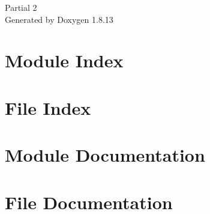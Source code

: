 \documentclass[twoside]{book}
\newcommand{\+}{\discretionary{\mbox{\scriptsize$\hookleftarrow$}}{}{}}
\newcommand{\clearemptydoublepage}{%
  \newpage{\pagestyle{empty}\cleardoublepage}%
}
\begin{document}
\hypersetup{pageanchor=false,
             bookmarksnumbered=true,
             pdfencoding=unicode
            }
\begin{titlepage}
\vspace*{7cm}
\begin{center}%
{\Large Partial 2 }\\
\vspace*{1cm}
{\large Generated by Doxygen 1.8.13}\\
\end{center}
\end{titlepage}
\clearemptydoublepage
{}
\tableofcontents
\clearemptydoublepage
{}
\hypersetup{pageanchor=true}

\chapter{Module Index}

\chapter{File Index}

\chapter{Module Documentation}
























\chapter{File Documentation}






























\backmatter
\newpage
{}
\clearemptydoublepage
{}
\printindex
\end{document}

